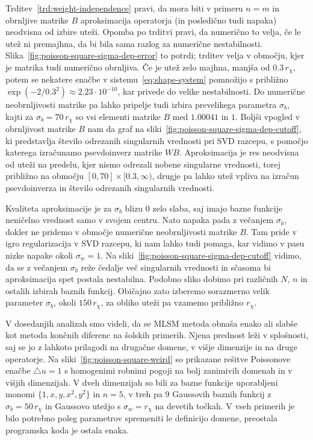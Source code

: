 \documentclass[12pt,a4paper,twoside]{article}
\theoremstyle{definition} %
\theoremstyle{plain} %
\numberwithin{equation}{section}
\newcommand{\lap}{\triangle}
\begin{document}
Trditev~\ref{trd:weight-independence} pravi, da mora biti v primeru $n=m$ in obrnljive matrike $B$
aproksimacija operatorja (in posledično tudi napaka) neodvisna od izbire uteži. Opomba po trditvi
pravi, da numerično to velja, če le utež ni premajhna, da bi bila sama razlog za numerične
nestabilnosti. Slika~\ref{fig:poisson-square-sigma-dep-error} to potrdi; trditev velja v območju,
kjer je matrika tudi numerično obrnljiva. Če je utež zelo majhna, manjša od $0.3\,r_\chi$, potem se
nekatere enačbe v sistemu~\eqref{eq:shape-system} pomnožijo s približno $\exp(-2/0.3^2) \approx
2.23\cdot10^{-10}$, kar privede do velike nestabilnosti. Do numerične neobrnljivosti matrike pa
lahko pripelje tudi izbira prevelikega parametra $\sigma_b$, kajti za $\sigma_b = 70\,r_\chi$ so vsi
elementi matrike $B$ med $1.00041$ in $1$. Boljši vpogled v obrnljivost matrike $B$ nam da graf na
sliki~\ref{fig:poisson-square-sigma-dep-cutoff}, ki predstavlja število odrezanih singularnih
vrednosti pri SVD razcepu, s pomočjo katerega izračunamo psevdoinverz matrike $WB$.
Aproksimacija je res neodvisna od uteži na predelu, kjer nismo odrezali nobene singularne vrednosti,
torej približno na območju $[0, 70] \times [0.3, \infty)$, drugje pa lahko utež vpliva na izračun
psevdoinverza in število odrezanih singularnih vrednosti.

Kvaliteta aproksimacije je za $\sigma_b$ blizu 0 zelo slaba, saj imajo bazne funkcije neničelno
vrednost samo v svojem centru. Nato napaka pada z večanjem $\sigma_b$, dokler ne pridemo v območje
numerične neobrnljivosti matrike $B$. Tam pride v igro regularizacija v SVD razcepu, ki nam lahko
tudi pomaga, kar vidimo v pasu nizke napake okoli $\sigma_w = 1$. Na
sliki~\ref{fig:poisson-square-sigma-dep-cutoff} vidimo, da se z večanjem $\sigma_b$ reže čedalje več
singularnih vrednosti in sčasoma bi aproksimacija spet postala nestabilna. Podobno sliko dobimo pri
različnih $N$, $n$ in ostalih izbirah baznih funkcij. Običajno zato izberemo sorazmerno velik
parameter $\sigma_b$, okoli $150\,r_\chi$, za obliko uteži pa vzamemo približno $r_\chi$.

V dosedanjih analizah smo videli, da se MLSM metoda obnaša enako ali slabše kot metoda končnih
diferenc na šolskih primerih. Njena prednost leži v splošnosti, saj se jo z lahkoto prilagodi na
drugačne domene, v višje dimenzije in na druge operatorje. Na sliki~\ref{fig:poisson-square-weird}
so prikazane rešitve Poissonove enačbe $\lap u = 1$ s homogenimi robnimi pogoji na bolj zanimivih
domenah in v višjih dimenzijah. V dveh dimenzijah so bili za bazne funkcije uporabljeni monomi $\{1,
x, y, x^2, y^2\}$ in $n=5$, v treh pa 9 Gaussovih baznih funkcij z $\sigma_b = 50\,r_\chi$ in
Gaussovo utežjo s $\sigma_w = r_\chi$ na devetih točkah. V vseh primerih je bilo potrebno poleg
parametrov spremeniti le definicijo domene, preostala programska koda je ostala enaka.
\vspace{5ex}
\end{document}
